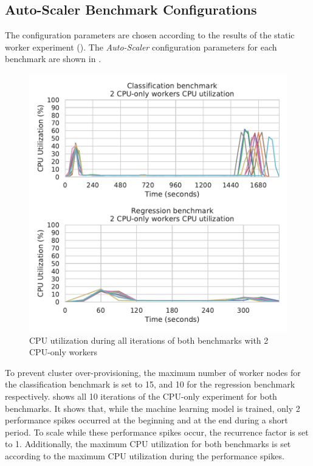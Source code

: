\subsection{Auto-Scaler Benchmark Configurations}
The configuration parameters are chosen according to the results of the static worker experiment ().
The \textit{Auto-Scaler} configuration parameters for each benchmark are shown in .
\begin{figure}[h]
\centering
\includegraphics[scale=0.9]{images/07_evaluation/overall_auto-scaler_iterations}
\caption{CPU utilization during all iterations of both benchmarks with 2 CPU-only workers}
\label{fig:07_auto-scaler_iterations_results}
\end{figure}
To prevent cluster over-provisioning, the maximum number of worker nodes for the classification benchmark is set to 15, and 10 for the regression benchmark respectively.
 shows all 10 iterations of the CPU-only experiment for both benchmarks. It shows that, while the machine learning model is trained, only 2 performance spikes occurred at the beginning and at the end during a short period. To scale while these performance spikes occur, the recurrence factor is set to 1. Additionally, the maximum CPU utilization for both benchmarks is set according to the maximum CPU utilization during the performance spikes.
